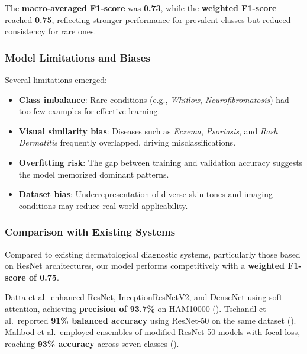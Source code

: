 \documentclass[
  12pt,
  oneside]{article}
\providecommand{\tightlist}{%
  \setlength{\itemsep}{0pt}\setlength{\parskip}{0pt}}
\begin{document}
The \textbf{macro-averaged F1-score} was \textbf{0.73}, while the
\textbf{weighted F1-score} reached \textbf{0.75}, reflecting stronger
performance for prevalent classes but reduced consistency for rare ones.

\subsubsection{Model Limitations and
Biases}\label{model-limitations-and-biases}

Several limitations emerged:

\begin{itemize}
\tightlist
\item
  \textbf{Class imbalance}: Rare conditions (e.g., \emph{Whitlow},
  \emph{Neurofibromatosis}) had too few examples for effective
  learning.\\
\item
  \textbf{Visual similarity bias}: Diseases such as \emph{Eczema},
  \emph{Psoriasis}, and \emph{Rash Dermatitis} frequently overlapped,
  driving misclassifications.\\
\item
  \textbf{Overfitting risk}: The gap between training and validation
  accuracy suggests the model memorized dominant patterns.\\
\item
  \textbf{Dataset bias}: Underrepresentation of diverse skin tones and
  imaging conditions may reduce real-world applicability.
\end{itemize}

\subsubsection{Comparison with Existing
Systems}\label{comparison-with-existing-systems}

Compared to existing dermatological diagnostic systems, particularly
those based on ResNet architectures, our model performs competitively
with a \textbf{weighted F1-score of 0.75}.

Datta et al.~enhanced ResNet, InceptionResNetV2, and DenseNet using
soft-attention, achieving \textbf{precision of 93.7\%} on HAM10000
(). Tschandl et
al.~reported \textbf{91\% balanced accuracy} using ResNet-50 on the same
dataset ().
Mahbod et al.~employed ensembles of modified ResNet-50 models with focal
loss, reaching \textbf{93\% accuracy} across seven classes
().
\end{document}
